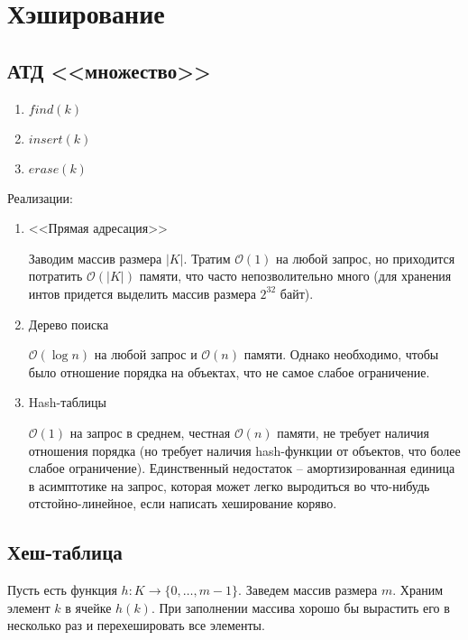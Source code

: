 \documentclass[fleqn, 12pt]{article}
\newcommand{\bigo}{\mathcal{O}}
\begin{document}
\section{Хэширование}

\subsection{АТД <<множество>>}

\begin{enumerate}
	\item $ find(k) $
	
	\item $ insert(k) $
	
	\item $ erase(k) $
	
\end{enumerate}

Реализации:

\begin{enumerate}
	\item <<Прямая адресация>>
	
	Заводим массив размера $ |K| $. Тратим $ \bigo(1) $ на любой запрос, но приходится потратить $ \bigo(|K|) $ памяти, что часто непозволительно много (для хранения интов придется выделить массив размера $ 2^32 $ байт).
	
	\item Дерево поиска
	
	$ \bigo(\log n) $ на любой запрос и $ \bigo(n) $ памяти. Однако необходимо, чтобы было отношение порядка на объектах, что не самое слабое ограничение.
	
	\item Hash-таблицы
	
	$ \bigo(1) $ на запрос в среднем, честная $ \bigo(n) $ памяти, не требует наличия отношения порядка (но требует наличия hash-функции от объектов, что более слабое ограничение). Единственный недостаток -- амортизированная единица в асимптотике на запрос, которая может легко выродиться во что-нибудь отстойно-линейное, если написать хеширование коряво.
	
\end{enumerate}



\subsection{Хеш-таблица}

Пусть есть функция $ h \colon K \to \{ 0, \ldots, m - 1 \} $. Заведем массив размера $ m $. Храним элемент $ k $ в ячейке $ h(k) $. При заполнении массива хорошо бы вырастить его в несколько раз и перехешировать все элементы.
\end{document}
